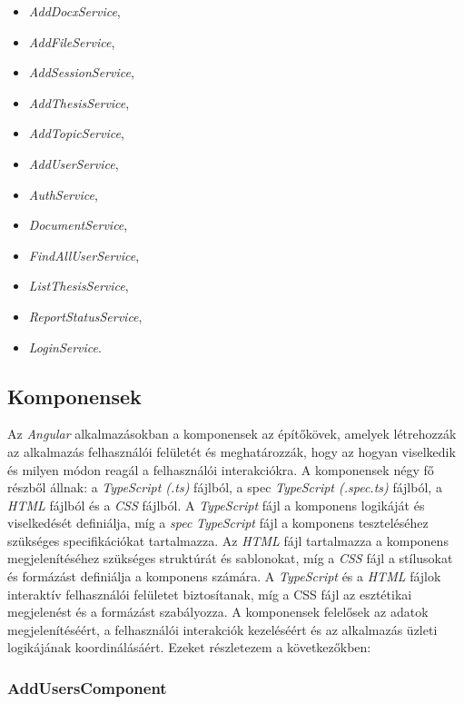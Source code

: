 \begin{itemize}

\item{\textit{AddDocxService}},
\item{\textit{AddFileService}},
\item{\textit{AddSessionService}},
\item{\textit{AddThesisService}},
\item{\textit{AddTopicService}},
\item{\textit{AddUserService}},
\item{\textit{AuthService}},
\item{\textit{DocumentService}},
\item{\textit{FindAllUserService}},
\item{\textit{ListThesisService}},
\item{\textit{ReportStatusService}},
\item{\textit{LoginService}}.

\end{itemize}


\subsection{Komponensek}

Az \textit{Angular} alkalmazásokban a komponensek az építőkövek, amelyek létrehozzák az alkalmazás felhasználói felületét és meghatározzák, hogy az hogyan viselkedik és milyen módon reagál a felhasználói interakciókra. A komponensek négy fő részből állnak: a \textit{TypeScript (.ts)} fájlból, a spec \textit{TypeScript (.spec.ts)} fájlból, a \textit{HTML} fájlból és a \textit{CSS} fájlból. A \textit{TypeScript} fájl a komponens logikáját és viselkedését definiálja, míg a \textit{spec} \textit{TypeScript} fájl a komponens teszteléséhez szükséges specifikációkat tartalmazza. Az \textit{HTML} fájl tartalmazza a komponens megjelenítéséhez szükséges struktúrát és sablonokat, míg a \textit{CSS} fájl a stílusokat és formázást definiálja a komponens számára. A \textit{TypeScript} és a \textit{HTML} fájlok interaktív felhasználói felületet biztosítanak, míg a CSS fájl az esztétikai megjelenést és a formázást szabályozza. A komponensek felelősek az adatok megjelenítéséért, a felhasználói interakciók kezeléséért és az alkalmazás üzleti logikájának koordinálásáért. Ezeket részletezem a következőkben:

\subsubsection{AddUsersComponent}

